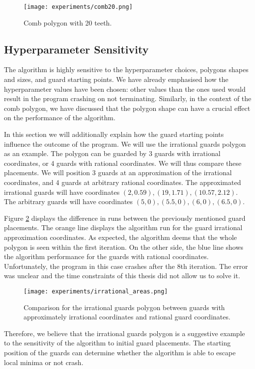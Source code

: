 \begin{figure}[h!]
    \centering
    \texttt{[image: experiments/comb20.png]}
    \caption{Comb polygon with 20 teeth.}
    \label{fig:comb20}
\end{figure}

\subsection{Hyperparameter Sensitivity}
\label{sec:hyperparameters}
The algorithm is highly sensitive to the hyperparameter choices, polygons shapes and sizes, and guard starting points. We have already emphasised how the hyperparameter values have been chosen: other values than the ones used would result in the program crashing on not terminating. Similarly, in the context of the comb polygon, we have discussed that the polygon shape can have a crucial effect on the performance of the algorithm.

In this section we will additionally explain how the guard starting points influence the outcome of the program. We will use the irrational guards polygon \cite{abrahamsen2021art} as an example.
The polygon can be guarded by 3 guards with irrational coordinates, or 4 guards with rational coordinates. We will thus compare these placements. We will position 3 guards at an approximation of the irrational coordinates, and 4 guards at arbitrary rational coordinates. The approximated irrational guards will have coordinates $(2, 0.59), (19, 1.71), (10.57, 2.12)$. The arbitrary guards will have coordinates $(5, 0), (5.5, 0), (6, 0), (6.5, 0)$.

Figure \ref{fig:irrational} displays the difference in runs between the previously mentioned guard placements. The orange line displays the algorithm run for the guard irrational approximation coordinates. As expected, the algorithm deems that the whole polygon is seen within the first iteration. On the other side, the blue line shows the algorithm performance for the guards with rational coordinates. Unfortunately, the program in this case crashes after the 8th iteration. The error was unclear and the time constraints of this thesis did not allow us to solve it.

\begin{figure}[!h]
    \centering
    \texttt{[image: experiments/irrational\_areas.png]}
    \caption{Comparison for the irrational guards polygon between guards with approximately irrational coordinates and rational guard coordinates.}
    \label{fig:irrational}
\end{figure}

Therefore, we believe that the irrational guards polygon is a suggestive example to the sensitivity of the algorithm to initial guard placements. The starting position of the guards can determine whether the algorithm is able to escape local minima or not crash.
